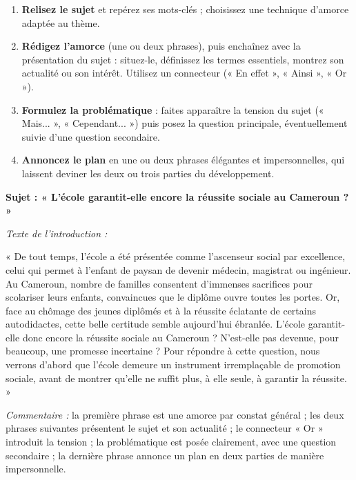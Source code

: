 \documentclass[11pt]{article}
\begin{document}
\begin{methode}
\begin{enumerate}
\item \textbf{Relisez le sujet} et repérez ses mots-clés ; choisissez une technique d'amorce adaptée au thème.
\item \textbf{Rédigez l'amorce} (une ou deux phrases), puis enchaînez avec la présentation du sujet : situez-le, définissez les termes essentiels, montrez son actualité ou son intérêt. Utilisez un connecteur (« En effet », « Ainsi », « Or »).
\item \textbf{Formulez la problématique} : faites apparaître la tension du sujet (« Mais... », « Cependant... ») puis posez la question principale, éventuellement suivie d'une question secondaire.
\item \textbf{Annoncez le plan} en une ou deux phrases élégantes et impersonnelles, qui laissent deviner les deux ou trois parties du développement.
\end{enumerate}
\end{methode}

\begin{exemplebox}
\textbf{Sujet : « L'école garantit-elle encore la réussite sociale au Cameroun ? »}

\emph{Texte de l'introduction :}

« De tout temps, l'école a été présentée comme l'ascenseur social par excellence, celui qui permet à l'enfant de paysan de devenir médecin, magistrat ou ingénieur. Au Cameroun, nombre de familles consentent d'immenses sacrifices pour scolariser leurs enfants, convaincues que le diplôme ouvre toutes les portes. Or, face au chômage des jeunes diplômés et à la réussite éclatante de certains autodidactes, cette belle certitude semble aujourd'hui ébranlée. L'école garantit-elle donc encore la réussite sociale au Cameroun ? N'est-elle pas devenue, pour beaucoup, une promesse incertaine ? Pour répondre à cette question, nous verrons d'abord que l'école demeure un instrument irremplaçable de promotion sociale, avant de montrer qu'elle ne suffit plus, à elle seule, à garantir la réussite. »

\emph{Commentaire :} la première phrase est une amorce par constat général ; les deux phrases suivantes présentent le sujet et son actualité ; le connecteur « Or » introduit la tension ; la problématique est posée clairement, avec une question secondaire ; la dernière phrase annonce un plan en deux parties de manière impersonnelle.
\end{exemplebox}
\end{document}
